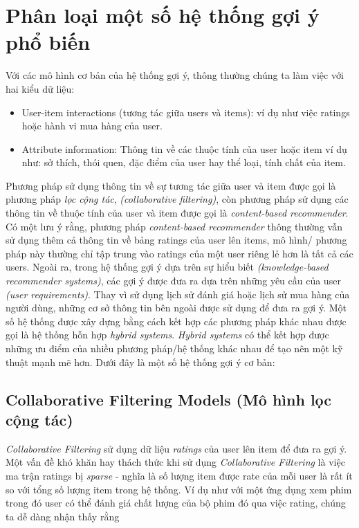 \documentclass[14pt]{article}
\begin{document}
	\section{Phân loại một số hệ thống gợi ý phổ biến}
		Với các mô hình cơ bản của hệ thống gợi ý, thông thường chúng ta làm việc với hai kiểu dữ liệu:
		\begin{itemize}
			\item User-item interactions (tương tác giữa users và items): ví dụ như việc ratings hoặc hành vi mua hàng của user.
			\item Attribute information: Thông tin về các thuộc tính của user hoặc item ví dụ như: sở thích, thói quen, đặc điểm của user hay thể loại, tính chất của item.
		\end{itemize}
		
		Phương pháp sử dụng thông tin về sự tương tác giữa user và item được gọi là phương pháp \textit{lọc cộng tác}, \textit{(collaborative filtering)}, còn phương pháp sử dụng các thông tin về thuộc tính của user và item được gọi là \textit{content-based recommender}. Có một lưu ý rằng, phương pháp \textit{content-based recommender} thông thường vẫn sử dụng thêm cả thông tin về bảng ratings của user lên items, mô hình/ phương pháp này thường chỉ tập trung vào ratings của một user riêng lẻ hơn là tất cả các users. Ngoài ra, trong hệ thống gợi ý dựa trên sự hiểu biết \textit{(knowledge-based recommender systems)}, các gợi ý được đưa ra dựa trên những yêu cầu của user \textit{(user requirements)}. Thay vì sử dụng lịch sử đánh giá hoặc lịch sử mua hàng của người dùng, những cơ sở thông tin bên ngoài được sử dụng để đưa ra gợi ý. Một số hệ thống được xây dựng bằng cách kết hợp các phương pháp khác nhau được gọi là hệ thống hỗn hợp \textit{hybrid systems}. \textit{Hybrid systems} có thể kết hợp được những ưu điểm của nhiều phương pháp/hệ thống khác nhau để tạo nên một kỹ thuật mạnh mẽ hơn. Dưới đây là một số hệ thống gợi ý cơ bản: 
		
		
		\subsection{Collaborative Filtering Models (Mô hình lọc cộng tác)}
			\textit{Collaborative Filtering} sử dụng dữ liệu \textit{ratings} của user lên item để đưa ra gợi ý. Một vấn đề khó khăn hay thách thức khi sử dụng \textit{Collaborative Filtering} là việc ma trận ratings bị \textit{sparse} - nghĩa là số lượng item được rate của mỗi user là rất ít so với tổng số lượng item trong hệ thống. Ví dụ như với một ứng dụng xem phim trong đó user có thể đánh giá chất lượng của bộ phim đó qua việc rating, chúng ta dễ dàng nhận thấy rằng 
\end{document}
